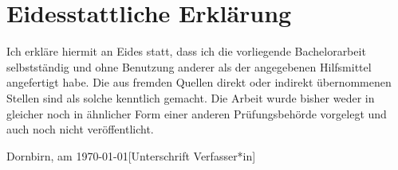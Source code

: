 \chapter*{Eidesstattliche Erklärung}

Ich erkläre hiermit an Eides statt, dass ich die vorliegende Bachelorarbeit selbstständig und ohne Benutzung anderer als der angegebenen Hilfsmittel angefertigt habe. Die aus fremden Quellen direkt oder indirekt übernommenen Stellen sind als solche kenntlich gemacht. Die Arbeit wurde bisher weder in gleicher noch in ähnlicher Form einer anderen Prüfungsbehörde vorgelegt und auch noch nicht veröffentlicht.

\vspace{3cm}
\noindent
Dornbirn, am \today \hfill [Unterschrift Verfasser*in]